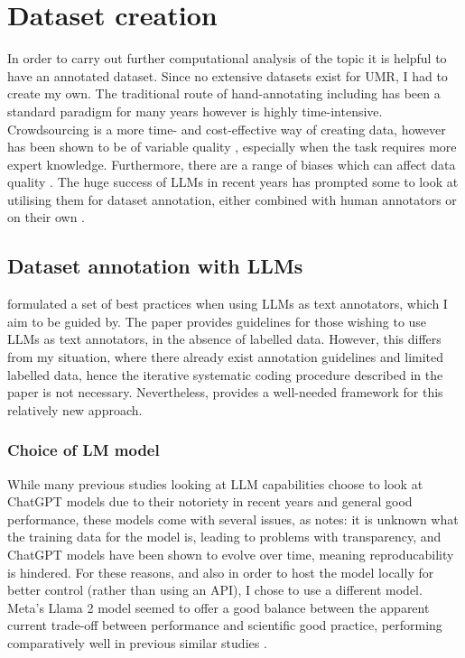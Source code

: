 \section{Dataset creation}
\label{sec:dataset_creation}
In order to carry out further computational analysis of the topic it is helpful to have an annotated dataset. Since no extensive datasets exist for UMR, I had to create my own. The traditional route of hand-annotating including has been a standard paradigm for many years however is highly time-intensive. Crowdsourcing is a more time- and cost-effective way of creating data, however has been shown to be of variable quality \citep{li2024comparative}, especially when the task requires more expert knowledge. Furthermore, there are a range of biases which can affect data quality \citep{Beck2023}. The huge success of LLMs in recent years has prompted some to look at utilising them for dataset annotation, either combined with human annotators \citep{goel2023llms} or on their own \citep{he2023annollm, llmsForPragAndDiscAnalysis, Gilardi_2023}.

\subsection{Dataset annotation with LLMs}
\citet{törnberg2024best} formulated a set of best practices when using LLMs as text annotators, which I aim to be guided by. The paper provides guidelines for those wishing to use LLMs as text annotators, in the absence of labelled data. However, this differs from my situation, where there already exist annotation guidelines and limited labelled data, hence the iterative systematic coding procedure described in the paper is not necessary. Nevertheless, \citet{törnberg2024best} provides a well-needed framework for this relatively new approach. 

\subsubsection*{Choice of LM model}
While many previous studies looking at LLM capabilities choose to look at ChatGPT models due to their notoriety in recent years and general good performance, these models come with several issues, as \citet{törnberg2024best} notes: it is unknown what the training data for the model is, leading to problems with transparency, and ChatGPT models have been shown to evolve over time, meaning reproducability is hindered. For these reasons, and also in order to host the model locally for better control (rather than using an API), I chose to use a different model. Meta's Llama 2 model \citep{touvron2023llama} seemed to offer a good balance between the apparent current trade-off between performance and scientific good practice, performing comparatively well in previous similar studies \citep{yuan2023futureTimeLlama, li2023labelsupervisedllamafinetuning}.

